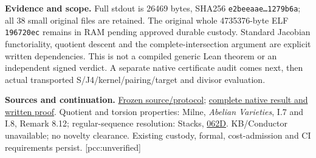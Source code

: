 \documentclass[10pt,a4paper]{article}
\begin{document}
\textbf{Evidence and scope.} Full stdout is 26469 bytes, SHA256
\texttt{e2beeaae\ldots1279b6a}; all 38 small original files are retained.
The original whole 4735376-byte ELF
\texttt{196720ec} remains in RAM pending approved durable
custody. Standard Jacobian functoriality, quotient descent and the
complete-intersection argument are explicit written dependencies.
This is not a compiled generic Lean theorem or an independent signed
verdict. A separate native certificate audit comes next, then actual
transported S/J4/kernel/pairing/target and divisor evaluation.

\textbf{Sources and continuation.}
\href{https://github.com/isogeny-labs/crypto/tree/575953011ab00e509dd7c25beeaa45e17397c575/research/chained_cm19_3torsion_divisors_20261123}{Frozen source/protocol};
\href{https://github.com/isogeny-labs/crypto/tree/1b04550ed1131174198784468df884807b2d884b/research/chained_cm19_3torsion_divisors_20261123}{complete native result and written proof}.
Quotient and torsion properties: Milne, \emph{Abelian Varieties}, I.7 and I.8, Remark 8.12;
regular-sequence resolution: Stacks, \href{https://stacks.math.columbia.edu/tag/062D}{062D}.
KB/Conductor unavailable; no novelty clearance. Existing custody,
formal, cost-admission and CI requirements persist. [pcc:unverified]
\end{document}
